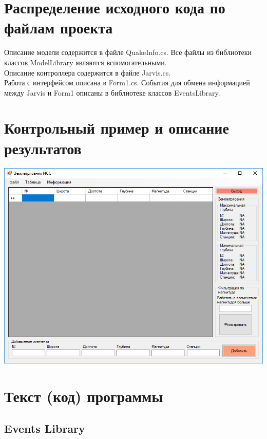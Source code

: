 \documentclass[a4paper,12pt, fleqn]{article}
\theoremstyle{plain} %
\theoremstyle{definition} %
\theoremstyle{remark} %
\numberwithin{equation}{section}
\begin{document}
\section{Распределение исходного кода по файлам проекта}
Описание модели содержится в файле QuakeInfo.cs. Все файлы из библиотеки классов ModelLibrary являются вспомогательными.\\
Описание контроллера содержится в файле Jarvis.cs.\\
Работа с интерфейсом описана в Form1.cs.
События для обмена информацией между Jarvis и Form1 описаны в библиотеке классов EventsLibrary.


\section{Контрольный пример и описание результатов}
\includegraphics[width=1\linewidth]{q1.png}


\section{Текст (код) программы}
\subsection{Events Library}
\end{document}
